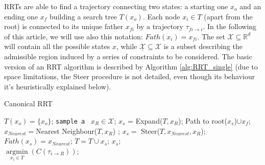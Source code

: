 RRTs are able to find a trajectory connecting two states: a starting one $x_o$ and an ending one $x_f$ building a search tree $T(x_o)$.
Each node $x_i \in T$ (apart from the root) is connected to its unique father $x_{fi}$ by a trajectory $\tau_{fi \rightarrow i}$. In the following of this article, we will use also this notation: $Fath(x_i)=x_{fi}$.
The set $\mathcal{X} \subseteq \mathbb{R}^{d} $ will contain all the possible states $x$, while $\underline{\mathcal{X}} \subseteq \mathcal{X}$ is a subset describing the admissible region induced by a series of constraints to be considered. 
The basic version of an RRT algorithm is described by Algorithm \ref{alg:RRT_single} (due to space limitations, the Steer procedure is not detailed, even though its behaviour it's heuristically explained below).

\begin{algorithm}
\caption{Canonical RRT}\label{alg:RRT_single}
\begin{algorithmic}[1]
\State $T(x_o)= \lbrace x_o \rbrace$; 
	\State \texttt{sample a}\,\,\, $x_R \in  \mathcal{X}$; 
	\State $x_s$ = Expand($T , x_R$);
		\State \Return Path to root($x_s$)$ \cup x_f$;	
	\EndIf
\EndFor
\EndProcedure
\\
\State $x_{Nearest}=$Nearest Neighbour($T, x_R$) ;
\State $x_s=$ Steer($T, x_{Nearest}, x_R$);
\State $Fath(x_s)=x_{Nearest}$;
\State $T = T \cup x_s$;
\EndIf
\Return $x_s$;
\EndProcedure
\\
\State \Return $\underset{x_i \in T}{\operatorname{argmin}}( C(\tau_{i \rightarrow R } ) )$;
\EndProcedure
\end{algorithmic}
\end{algorithm}

